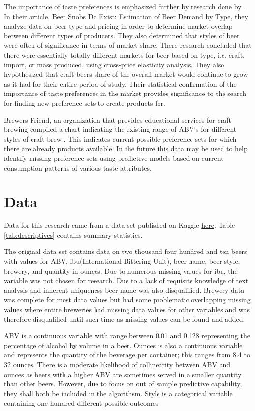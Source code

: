 \documentclass[12pt,english]{article}
\begin{document}
The importance of taste preferences is emphasized further by research done by \citeauthor{beersnobs}.  In their article, Beer Snobs Do Exist: Estimation of Beer Demand by Type, they analyze data on beer type and pricing in order to determine market overlap between different types of producers.  They also determined that styles of beer were often of significance in terms of market share.  There research concluded that there were essentially totally different markets for beer based on type, i.e. craft, import, or mass produced, using cross-price elasticity analysis.  They also hypothesized that craft beers share of the overall market would continue to grow as it had for their entire period of study.  Their statistical confirmation of the importance of taste preferences in the market provides significance to the search for finding new preference sets to create products for.

Brewers Friend, an organization that provides educational services for craft brewing compiled a chart indicating the existing range of ABV's for different styles of craft brew \citep{BrewersFriend}.  This indicates current possible preference sets for which there are already products available.  In the future this data may be used to help identify missing preference sets using predictive models based on current consumption patterns of various taste attributes.

\section{Data}\label{sec:data}
Data for this research came from a data-set published on Kaggle \href{https://www.kaggle.com/nickhould/craft-cans/data}{here}. Table \ref{tab:descriptives} contains summary statistics.

The original data set contains data on two thousand four hundred and ten beers with values for ABV, ibu(International Bittering Unit), beer name, beer style, brewery, and quantity in ounces.  Due to numerous missing values for ibu, the variable was not chosen for research.  Due to a lack of requisite knowledge of text analysis and inherent uniqueness beer name was also disqualified.  Brewery data was complete for most data values but had some problematic overlapping missing values where entire breweries had missing data values for other variables and was therefore disqualified until such time as missing values can be found and added.

ABV is a continuous variable with range between 0.01 and 0.128 representing the percentage of alcohol by volume in a beer.  Ounces is also a continuous variable and represents the quantity of the beverage per container; this ranges from 8.4 to 32 ounces.  There is a moderate likelihood of collinearity between ABV and ounces as beers with a higher ABV are sometimes served in a smaller quantity than other beers.  However, due to focus on out of sample predictive capability, they shall both be included in the algorithsm.  Style is a categorical variable containing one hundred different possible outcomes.
\end{document}
